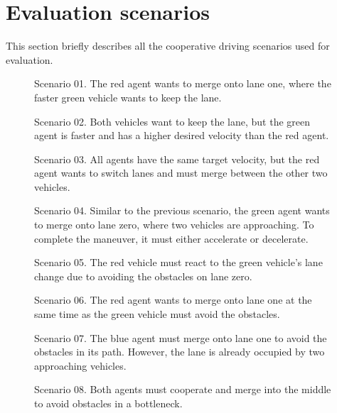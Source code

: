 \section{Evaluation scenarios}\label{app:scenarios}
This section briefly describes all the cooperative driving scenarios used for evaluation.
\begin{figure}[!h]
\centering

\caption[Scenario 01]{Scenario 01. The red agent wants to merge onto lane one, where the faster green vehicle wants to keep the lane.}\label{fig:sc01}
\end{figure}
\begin{figure}[!h]
\centering

\caption[Scenario 02]{Scenario 02. Both vehicles want to keep the lane, but the green agent is faster and has a higher desired velocity than the red agent.}\label{fig:sc02}
\end{figure}
\begin{figure}[!h]
\centering

\caption[Scenario 03]{Scenario 03. All agents have the same target velocity, but the red agent wants to switch lanes and must merge between the other two vehicles.}\label{fig:sc03}
\end{figure}
\begin{figure}[!h]
\centering

\caption[Scenario 04]{Scenario 04. Similar to the previous scenario, the green agent wants to merge onto lane zero, where two vehicles are approaching. To complete the maneuver, it must either accelerate or decelerate.}\label{fig:sc04}
\end{figure}
\begin{figure}[!h]
\centering

\caption[Scenario 05]{Scenario 05. The red vehicle must react to the green vehicle's lane change due to avoiding the obstacles on lane zero.}\label{fig:sc05}
\end{figure}
\begin{figure}[!h]
\centering

\caption[Scenario 06]{Scenario 06. The red agent wants to merge onto lane one at the same time as the green vehicle must avoid the obstacles.}\label{fig:sc06}
\end{figure}
\begin{figure}[!h]
\centering

\caption[Scenario 07]{Scenario 07. The blue agent must merge onto lane one to avoid the obstacles in its path. However, the lane is already occupied by two approaching vehicles.}\label{fig:sc07}
\end{figure}
\begin{figure}[!h]
\centering

\caption[Scenario 08]{Scenario 08. Both agents must cooperate and merge into the middle to avoid obstacles in a bottleneck.}\label{fig:sc08}
\end{figure}

